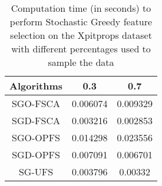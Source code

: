 \begin{table}
	\begin{center}
		\begin{tabular}{c c c}
			Algorithms & 0.3 & 0.7 \\
			\hline
			SGO-FSCA & 0.006074 & 0.009329 \\
			SGD-FSCA & 0.003216 & 0.002853 \\
			SGO-OPFS & 0.014298 & 0.023556 \\
			SGD-OPFS & 0.007091 & 0.006701 \\
			SG-UFS & 0.003796 & 0.00332 \\
		\end{tabular}
	\end{center}
	\caption{Computation time (in seconds) to perform Stochastic Greedy feature selection on the Xpitprops dataset with different percentages used to sample the data}
\end{table}